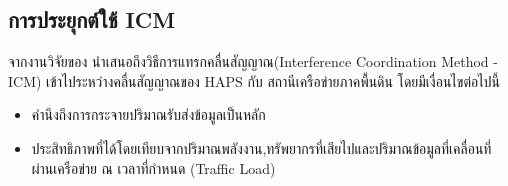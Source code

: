 \subsection{การประยุกต์ใช้ ICM}

จากงานวิจัยของ \cite[Interference Coordination Method for Integrated HAPS-Terrestrial Networks]{liu2021interference}
นำเสนอถึงวิธีการแทรกคลื่นสัญญาณ(Interference Coordination Method - ICM) เข้าไประหว่างคลื่นสัญญาณของ HAPS กับ สถานีเครือข่ายภาคพื้นดิน โดยมีเงื่อนไขต่อไปนี้
\begin{itemize}
    \item คำนึงถึงการกระจายปริมาณรับส่งข้อมูลเป็นหลัก 
    \item ประสิทธิภาพที่ได้โดยเทียบจากปริมาณพลังงาน,ทรัพยากรที่เสียไปและปริมาณข้อมูลที่เคลื่อนที่ผ่านเครือข่าย ณ เวลาที่กำหนด (Traffic Load)
\end{itemize}
